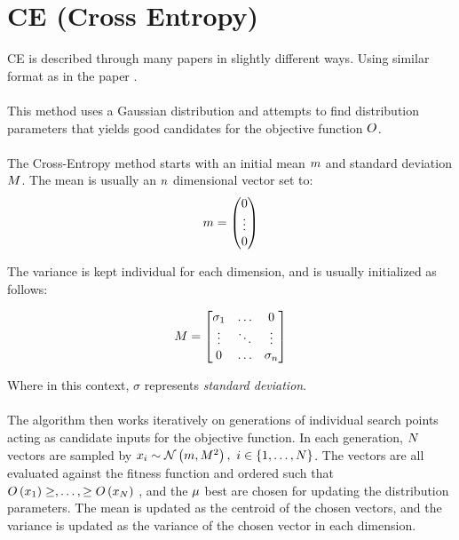 \section{CE (Cross Entropy) \label{CrossEntropy}}
CE is described through many papers in 
slightly different ways. Using similar 
format as in the paper \citep{thiery:09}.\\
\\
This method uses a Gaussian distribution and 
attempts to find distribution parameters 
that yields good candidates for the 
objective function $O$.\\
\\
The Cross-Entropy method starts with an initial 
mean $m$ and standard deviation $M$. 
The mean is usually an $n$ dimensional vector
set to:
\begin{align*}
m = \begin{pmatrix}
0\\
\vdots\\
0
\end{pmatrix} 
\end{align*}

The variance is kept individual for each dimension, 
and is usually initialized as follows:

\begin{align*}
M =
\begin{bmatrix}
\sigma_1 & \hdots & 0\\
\vdots & \ddots & \vdots\\
0 & \hdots & \sigma_{n}
\end{bmatrix}
\end{align*}

Where in this context, $\sigma$ represents \textit{standard deviation}.\\
\\
The algorithm then works iteratively on generations of individual
search points acting as candidate inputs for the objective function.
In each generation, $N$ vectors are sampled by 
$x_{i} \sim \mathcal{N} \left(m, M^{2} \right)
,\ i \in \{1,\dots,N \}$. The vectors are all evaluated 
against the fitness function and ordered such that $O \left( x_{1} \right) \geq, \dots, \geq O \left( x_{N} \right)$
, and the $\mu$ best are chosen for updating the distribution 
parameters. The mean is updated as the centroid of the chosen vectors, and
the variance is updated as the variance of the chosen vector in each 
dimension.\\

